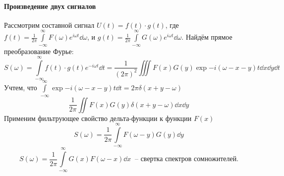 \documentclass[a4paper,14pt]{extarticle}
\begin{document}
\paragraph{Произведение двух сигналов}%
Рассмотрим составной сигнал $U(t) = f(t) \cdot g(t)$, где 
$f(t) = \frac{1}{2 \pi} \int\limits_{-\infty}^{\infty} 
F(\omega) e^{i \omega t} \dd \omega $, и 
$g(t) = \frac{1}{2 \pi} \int\limits_{-\infty}^{\infty} 
G(\omega) e^{i \omega t} \dd \omega $.  
Найдём прямое преобразование Фурье:
\begin{equation}
    \label{eq:}
    S(\omega) = \int\limits_{-\infty}^{\infty} 
    f(t)\cdot g(t) e^{-i \omega t} \dd t = 
    \frac{1}{(2 \pi)^2} \iiint F(x) G(y) \exp{- i(\omega - x - y)t} \dd{x} \dd{y} \dd{t} 
\end{equation}
Учтем, что 
$\int\limits_{-\infty}^{\infty}   \exp{-i(\omega-x-y)t} \dd t = 
2 \pi \delta(x+y - \omega) $
\begin{equation}
    \label{eq:}
    \frac{1}{2 \pi}  \iint F(x) G(y) \delta(x+y-\omega) \dd{x} \dd{y}
\end{equation}
Применим фильтрующее свойство дельта-функции к функции $F(x)$ 
\begin{equation}
    \label{eq:}
    S(\omega) = \frac{1}{2 \pi} \int\limits_{-\infty}^{\infty} 
    F(\omega - y) G(y) \dd{y}
\end{equation}
\begin{equation}
    \label{eq:}
    \boxed{
        S(\omega) = \frac{1}{2 \pi} \int\limits_{-\infty}^{\infty} 
        G(x) F(\omega - x) \dd{x}  ~ 
    } \text{ -- свертка спектров сомножителей.}
\end{equation}
\end{document}
